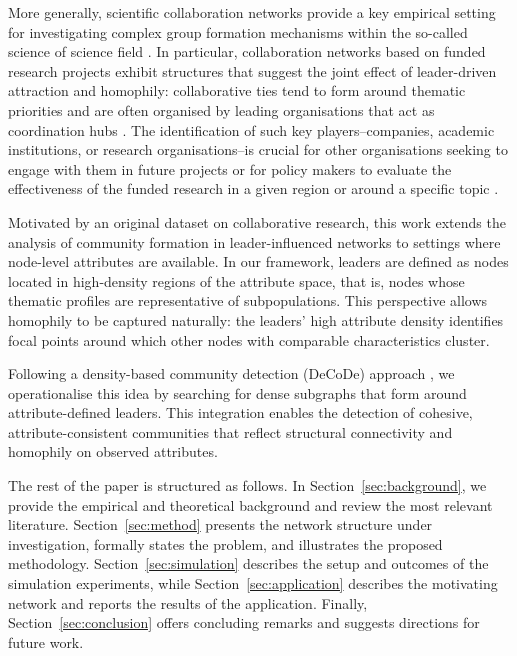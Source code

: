 \documentclass[11pt]{article}
\begin{document}
More generally, scientific collaboration networks provide a key empirical setting for investigating complex group formation mechanisms within the so-called science of science field \citep{liu2023data,fortunato2018science}. In particular, collaboration networks based on funded research projects exhibit structures that suggest the joint effect of leader-driven attraction and homophily: collaborative ties tend to form around thematic priorities and are often organised by leading organisations that act as coordination hubs \citep{Morea2024MappingAnalysis}. The identification of such key players--companies, academic institutions, or research organisations--is crucial for other organisations seeking to engage with them in future projects or for policy makers to evaluate the effectiveness of the funded research in a given region or around a specific topic \citep{Morea2024MappingAnalysis}.

Motivated by an original dataset on collaborative research, this work extends the analysis of community formation in leader-influenced networks to settings where node-level attributes are available.
In our framework, leaders are defined as nodes located in high-density regions of the attribute space, that is, nodes whose thematic profiles are representative of subpopulations. This perspective allows homophily to be captured naturally: the leaders' high attribute density identifies focal points around which other nodes with comparable characteristics cluster.

 Following a density-based community detection (DeCoDe) approach \citep{Menardi2022Density-basedNetworks}, we operationalise this idea by searching for dense subgraphs that form around attribute-defined leaders. This integration enables the detection of cohesive, attribute-consistent communities that reflect structural connectivity and homophily on observed attributes.

The rest of the paper is structured as follows.
In Section~\ref{sec:background}, we provide the empirical and theoretical background and review the most relevant literature.
Section~\ref{sec:method} presents the network structure under investigation, formally states the problem, and illustrates the proposed methodology.
Section~\ref{sec:simulation} describes the setup and outcomes of the simulation experiments, while Section~\ref{sec:application} describes the motivating network and reports the results of the application.
Finally, Section~\ref{sec:conclusion} offers concluding remarks and suggests directions for future work.
\end{document}

